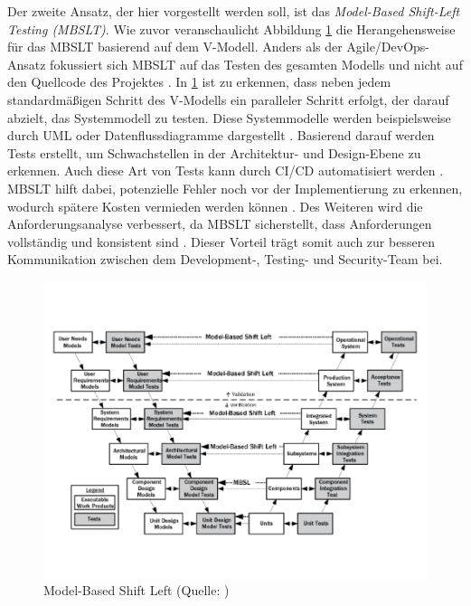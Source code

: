 Der zweite Ansatz, der hier vorgestellt werden soll, ist das \textit{Model-Based Shift-Left Testing (MBSLT)}. Wie zuvor veranschaulicht Abbildung \ref{fig:modelbased} die Herangehensweise für das MBSLT basierend auf dem V-Modell. Anders als der Agile/DevOps-Ansatz fokussiert sich MBSLT auf das Testen des gesamten Modells und nicht auf den Quellcode des Projektes \cite{rani_shift-left_2023}. In \ref{fig:modelbased} ist zu erkennen, dass neben jedem standardmäßigen Schritt des V-Modells ein paralleler Schritt erfolgt, der darauf abzielt, das Systemmodell zu testen. Diese Systemmodelle werden beispielsweise durch UML oder Datenflussdiagramme dargestellt \cite{rani_shift-left_2023}. Basierend darauf werden Tests erstellt, um Schwachstellen in der Architektur- und Design-Ebene zu erkennen. Auch diese Art von Tests kann durch CI/CD automatisiert werden \cite{rani_shift-left_2023}. MBSLT hilft dabei, potenzielle Fehler noch vor der Implementierung zu erkennen, wodurch spätere Kosten vermieden werden können \cite{rani_shift-left_2023}. Des Weiteren wird die Anforderungsanalyse verbessert, da MBSLT sicherstellt, dass Anforderungen vollständig und konsistent sind \cite{rani_shift-left_2023}. Dieser Vorteil trägt somit auch zur besseren Kommunikation zwischen dem Development-, Testing- und Security-Team bei.

\begin{figure}
    \centering
    \includegraphics[width=0.9\linewidth]{images/Model_Based_Shift_Left.png}
    \caption{Model-Based Shift Left (Quelle: )}
    \label{fig:modelbased}
\end{figure}

